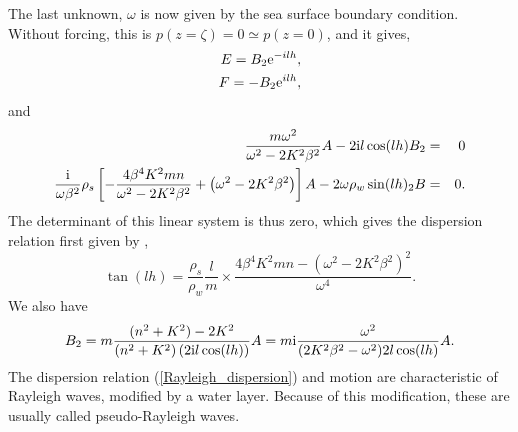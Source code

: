 The last unknown, $\omega$ is now given by the sea surface boundary condition. Without forcing, this is 
$p(z=\zeta)=0 \simeq p(z=0)$, and it gives,  
\begin{eqnarray}
E =  B_2 \mathrm{e}^{-il h}, \\
F =  -B_2 \mathrm{e}^{il h},
\end{eqnarray}
and  
\begin{eqnarray}
   \frac{m \omega^2}{\omega^2-2K^2 \beta^2}   A - 2 \mathrm{i} l  \cos(lh) B_2 &=& 0 \\
 \frac{\mathrm{i}}{\omega \beta^2} \rho_s\left[- \frac{4 \beta^4 K^2 m n}{\omega^2- 2K^2 \beta^2} + \left(\omega^2- 2K^2 \beta^2 \right)\right]
 A - 2 \omega  {\rho_w} \sin(lh)_2 B  &=& 0.
\end{eqnarray}
The determinant of this linear system is thus zero, which gives 
the dispersion relation first given by \cite{Stoneley1926}, %
\begin{equation}
 \tan  \left(  l h \right)=    \frac{\rho_s}{\rho_w} 
\frac{l}{m} 
\times \frac{4 \beta^4 K^2 m n  - \left (\omega^2- 2  K^2 \beta^2 \right)^2   }{ \omega^4 }.\label{Rayleigh_dispersion}
\end{equation}
We also have
\begin{equation}
 B_2=m\frac{(n^2+K^2)-2K^2}{(n^2+K^2)\left(2 \mathrm{i} l \cos(lh)\right)}A
=m \mathrm{i} \frac{\omega^2}{(2 K^2 \beta^2 - \omega^2) 2  l \cos(lh)}A.
\end{equation}
The dispersion relation (\ref{Rayleigh_dispersion}) and motion are characteristic of Rayleigh waves, modified by a water layer. Because of this modification, these
are usually called pseudo-Rayleigh waves. 

